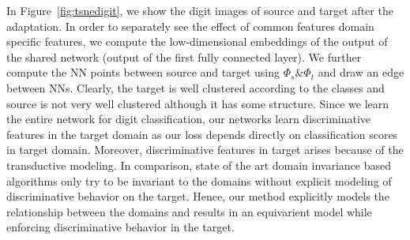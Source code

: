 In Figure~\ref{fig:tsnedigit}, we show the digit images of source and target after the adaptation. In order to separately see the effect of common features domain specific features, we compute the low-dimensional embeddings of the output of the shared network (output of the first fully connected layer). We further compute the NN points between source and target using $\Phi_s \& \Phi_t$ and draw an edge between NNs. Clearly, the target is well clustered according to the classes and source is not very well clustered although it has some structure. Since we learn the entire network for digit classification, our networks learn discriminative features in the target domain as our loss depends directly on classification scores in target domain. Moreover, discriminative features in target arises because of the transductive modeling. In comparison, state of the art domain invariance based algorithms only try to be invariant to the domains without explicit modeling of discriminative behavior on the target. Hence, our method explicitly models the relationship between the domains and results in an equivarient model while enforcing discriminative behavior in the target. 





